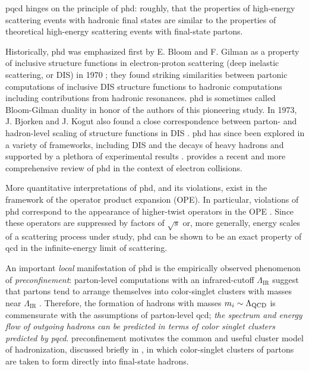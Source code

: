 \gls{pqcd} hinges on the principle of \gls{phd}:
%
roughly, that the properties of high-energy scattering events with hadronic final states are similar to the properties of theoretical high-energy scattering events with final-state partons.

Historically, \gls{phd} was emphasized first by E. Bloom and F. Gilman as a property of inclusive structure functions in electron-proton scattering (deep inelastic scattering, or DIS) in 1970 \cite{PhysRevLett.25.1140};
%
they found striking similarities between partonic computations of inclusive DIS structure functions to hadronic computations including contributions from hadronic resonances.
%
\gls{phd} is sometimes called Bloom-Gilman duality in honor of the authors of this pioneering study.
%
In 1973, J. Bjorken and J. Kogut also found a close correspondence between parton- and hadron-level scaling of structure functions in DIS \cite{Bjorken:1973gc}.
%
\Gls{phd} has since been explored in a variety of frameworks, including DIS \cite{Georgi:1976ve,Liuti:2011rw} and the decays of heavy hadrons \cite{Bigi:2002fj} and supported by a plethora of experimental results \cite{Niculescu:2000tk,Niculescu:2000tj,Navasardyan:2006gv,JeffersonLabE00-115:2009jll,Malace:2009dg}.
%
 provides a recent and more comprehensive review of \gls{phd} in the context of electron collisions.




More quantitative interpretations of \gls{phd}, and its violations, exist in the framework of the operator product expansion (OPE).
%
In particular, violations of \gls{phd} correspond to the appearance of higher-twist operators in the OPE \cite{DeRujula:1976baf}.
%
Since these operators are suppressed by factors of \(\sqrt{s}\) or, more generally, energy scales of a scattering process under study, \gls{phd} can be shown to be an exact property of \gls{qcd} in the infinite-energy limit of scattering.


An important \textit{local} manifestation of \gls{phd} is the empirically observed phenomenon of \textit{\gls{preconfinement}}:
%
parton-level computations with an infrared-cutoff \(\Lambda_\text{IR}\) suggest that partons tend to arrange themselves into color-singlet clusters with masses near \(\Lambda_\text{IR}\) \cite{Amati:1979fg,Marchesini:1980cr,Catani:1990rr}.
%
Therefore, the formation of hadrons with masses \(m_i \sim \Lambda_{\mathrm{QCD}}\) is commensurate with the assumptions of parton-level \gls{qcd};
%
\textit{the spectrum and energy flow of outgoing hadrons can be predicted in terms of color singlet clusters predicted by \gls{pqcd}}.
%
\Gls{preconfinement} motivates the common and useful cluster model of hadronization, discussed briefly in , in which color-singlet clusters of partons are taken to form directly into final-state hadrons.


